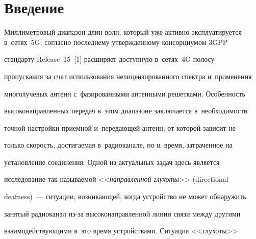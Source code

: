 




















      \thispagestyle{headings}


      


      \vspace*{-18pt} 





\section{Введение}





  Миллиметровый диапазон длин волн, который уже активно эксплуатируется в~сетях~5G, согласно последнему утвержденному консорциумом 3GPP 


стандарту Release~15~[1] расширяет доступную в~сетях~4G полосу 


пропускания за счет использования нелицензированного спектра и~применения 


многолучевых антенн с~фазированными антенными решетками. Особенность 


высоконаправленных передач в~этом диапазоне заключается в~необходимости 


точной настройки приемной и~передающей антенн, от которой зависит не 


только скорость, достигаемая в~радиоканале, но и~время, затраченное на 


установление соединения. Одной из актуальных задач здесь является 


исследование так называемой <<\textit{направленной глухоты}>> (directional 


deafness)~--- ситуации, возникающей, когда устройство не может обнаружить 


занятый радиоканал из-за высоконаправленной линии связи между другими 


взаимодействующими в~это время устройствами. Ситуация <<глухоты>> 


